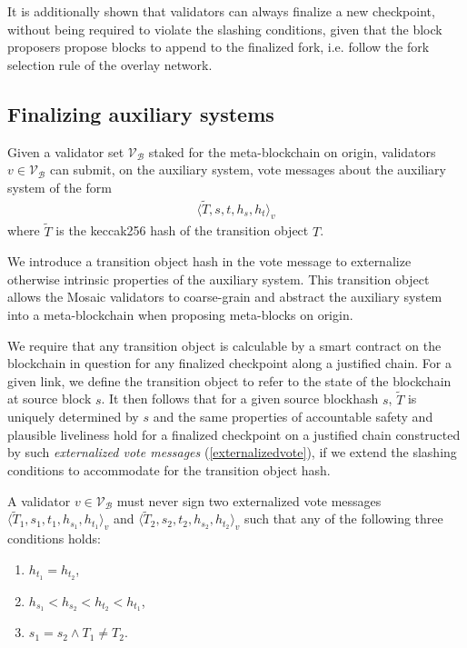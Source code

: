 \documentclass[12pt,a4paper]{article}
\begin{document}
It is additionally shown that validators can always finalize a new checkpoint, without being required to violate the slashing conditions, given that the block proposers propose blocks to append to the finalized fork, i.e. follow the fork selection rule of the overlay network.

\subsection{Finalizing auxiliary systems}
Given a validator set $\mathcal{V}_\mathcal{B}$ staked for the meta-blockchain on origin, validators $v \in \mathcal{V}_\mathcal{B}$ can submit, on the auxiliary system, vote messages about the auxiliary system of the form
\begin{align}\label{externalizedvote}
  \langle \tilde{T}, s, t, h_s, h_t \rangle_v
\end{align}
where $\tilde{T}$ is the keccak256 hash of the transition object $T$.

We introduce a transition object hash in the vote message to externalize otherwise intrinsic properties of the auxiliary system.
This transition object allows the Mosaic validators to coarse-grain and abstract the auxiliary system into a meta-blockchain when proposing meta-blocks on origin.

We require that any transition object is calculable by a smart contract on the blockchain in question for any finalized checkpoint along a justified chain.
For a given link, we define the transition object to refer to the state of the blockchain at source block $s$. %
It then follows that for a given source blockhash $s$, $\tilde{T}$ is uniquely determined by $s$ and the same properties of accountable safety and plausible liveliness hold for a finalized checkpoint on a justified chain constructed by such \emph{externalized vote messages} (\ref{externalizedvote}), if we extend the slashing conditions to accommodate for the transition object hash.

A validator $v \in \mathcal{V}_\mathcal{B}$ must never sign two externalized vote messages $\langle \tilde{T}_1, s_1, t_1, h_{s_1}, h_{t_1}\rangle_v$ and $\langle \tilde{T}_2, s_2, t_2, h_{s_2}, h_{t_2}\rangle_v$ such that any of the following three conditions holds:
\begin{enumerate}
  \item $h_{t_1} = h_{t_2}$,
  \item $h_{s_1} < h_{s_2} < h_{t_2} < h_{t_1}$,
  \item $s_1 = s_2 \land T_1 \neq T_2$.
\end{enumerate}
\end{document}
